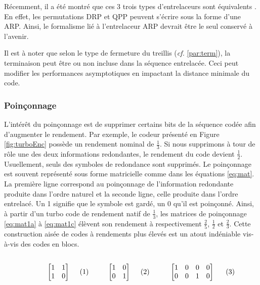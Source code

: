 Récemment, il a été montré que ces 3 trois types d'entrelaceurs sont équivalents \cite{EquivalenceInt}. En effet, les permutations DRP et QPP peuvent s'écrire sous la forme d'une ARP. Ainsi, le formalisme lié à l'entrelaceur ARP devrait être le seul conservé à l'avenir.

Il est à noter que selon le type de fermeture du treillis ({\it cf.} \ref{par:term}), la terminaison peut être ou non incluse dans la séquence entrelacée. Ceci peut modifier les performances asymptotiques en impactant la distance minimale du code.

\subsubsection{Poinçonnage}
L'intérêt du poinçonnage est de supprimer certains bits de la séquence codée afin d'augmenter le rendement. Par exemple, le codeur présenté en Figure \ref{fig:turboEnc} possède un rendement nominal de $\frac{1}{3}$. Si nous supprimons à tour de rôle une des deux informations redondantes, le rendement du code devient $\frac{1}{2}$. Usuellement, seuls des symboles de redondance sont supprimés. Le poinçonnage est souvent représenté sous forme matricielle comme dans les équations \ref{eq:mat}. La première ligne correspond au poinçonnage de l'information redondante produite dans l'ordre naturel et la seconde ligne, celle produite dans l'ordre entrelacé. Un 1 signifie que le symbole est gardé, un 0 qu'il est poinçonné. Ainsi, à partir d'un turbo code de rendement natif de $\frac{1}{3}$, les matrices de poinçonnage \ref{eq:mat1a} à \ref{eq:mat1c} élèvent son rendement à respectivement  $\frac{2}{5}$, $\frac{1}{2}$ et $\frac{2}{3}$. Cette construction aisée de codes à rendements plus élevés est un atout indéniable vis-à-vis des codes en blocs.

\begin{subequations}\label{eq:mat}
	\begin{minipage}{0.25\textwidth}
		\begin{align}
			\label{eq:mat1a}
			\begin{bmatrix}
			1 & 1 \\
			1 & 0 
			\end{bmatrix}
		\end{align}
	\end{minipage}
	\begin{minipage}{0.25\textwidth}
		\begin{align}
			\label{eq:mat1b}
			\begin{bmatrix}
			1 & 0 \\
			0 & 1 
			\end{bmatrix}
		\end{align}
	\end{minipage}
	\begin{minipage}{0.35\textwidth}
		\begin{align}
			\label{eq:mat1c}
			\begin{bmatrix}
			1 & 0 & 0 & 0 \\
			0 & 0 & 1 & 0 
			\end{bmatrix}
		\end{align}
	\end{minipage}
\end{subequations}

